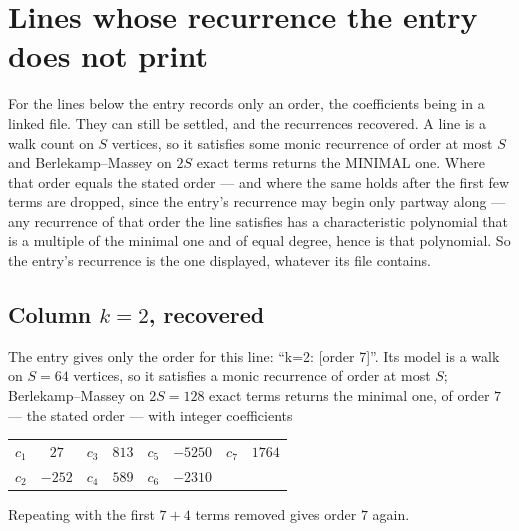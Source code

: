 \documentclass[11pt,a4paper]{article}
\theoremstyle{plain}
\theoremstyle{definition}
\begin{document}
\section{Lines whose recurrence the entry does not print}

For the lines below the entry records only an order, the coefficients being in a linked file.
They can still be settled, and the recurrences recovered. A line is a walk count on $S$
vertices, so it satisfies some monic recurrence of order at most $S$ and Berlekamp--Massey on
$2S$ exact terms returns the MINIMAL one. Where that order equals the stated order --- and
where the same holds after the first few terms are dropped, since the entry's recurrence may
begin only partway along --- any recurrence of that order the line satisfies has a
characteristic polynomial that is a multiple of the minimal one and of equal degree, hence is
that polynomial. So the entry's recurrence is the one displayed, whatever its file contains.

\subsection*{Column $k=2$, recovered}
The entry gives only the order for this line: ``k=2: [order 7]''. Its model is a walk on
$S=64$ vertices, so it satisfies a monic recurrence of order at most $S$;
Berlekamp--Massey on $2S=128$ exact terms returns the minimal one, of order
$7$ --- the stated order --- with integer coefficients
\begin{center}\small\begin{tabular}{cccccccc}
$c_{1}$ & $27$ & $c_{3}$ & $813$ & $c_{5}$ & $-5250$ & $c_{7}$ & $1764$ \\
$c_{2}$ & $-252$ & $c_{4}$ & $589$ & $c_{6}$ & $-2310$ &  &  \\
\end{tabular}\end{center}
Repeating with the first $7+4$ terms removed gives order $7$ again.
\end{document}
